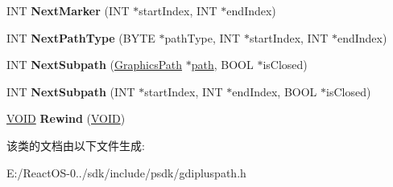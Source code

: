 \begin{DoxyCompactItemize}
\item 
\mbox{\label{class_graphics_path_iterator_aa37a26e5dbaa058cc2ffc252e071b8a2}} 
I\+NT {\bfseries Next\+Marker} (I\+NT $\ast$start\+Index, I\+NT $\ast$end\+Index)
\item 
\mbox{\label{class_graphics_path_iterator_a4709f2d0770ee5cb9ce6efa341ef12c8}} 
I\+NT {\bfseries Next\+Path\+Type} (B\+Y\+TE $\ast$path\+Type, I\+NT $\ast$start\+Index, I\+NT $\ast$end\+Index)
\item 
\mbox{\label{class_graphics_path_iterator_a30b9c9ae95309662e44b189c20f6b96a}} 
I\+NT {\bfseries Next\+Subpath} (\hyperlink{class_graphics_path}{Graphics\+Path} $\ast$\hyperlink{structpath}{path}, B\+O\+OL $\ast$is\+Closed)
\item 
\mbox{\label{class_graphics_path_iterator_ad876a7d6ded278e043b296ba10a1f7fa}} 
I\+NT {\bfseries Next\+Subpath} (I\+NT $\ast$start\+Index, I\+NT $\ast$end\+Index, B\+O\+OL $\ast$is\+Closed)
\item 
\mbox{\label{class_graphics_path_iterator_a24254d099d566224d2913b697cdf5378}} 
\hyperlink{interfacevoid}{V\+O\+ID} {\bfseries Rewind} (\hyperlink{interfacevoid}{V\+O\+ID})
\end{DoxyCompactItemize}


该类的文档由以下文件生成\+:\begin{DoxyCompactItemize}
\item 
E\+:/\+React\+O\+S-\/0../sdk/include/psdk/gdipluspath.\+h\end{DoxyCompactItemize}

